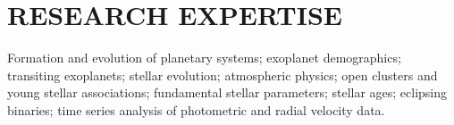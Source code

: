 \section{\large RESEARCH EXPERTISE}
Formation and evolution of planetary systems;  exoplanet demographics; transiting exoplanets; stellar evolution; atmospheric physics; open clusters and young stellar associations; fundamental stellar parameters; stellar ages; eclipsing binaries; time series analysis of photometric and radial velocity data.